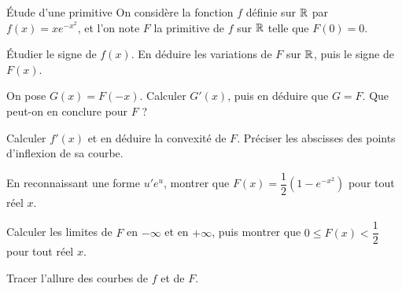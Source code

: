 \begin{exercice}[3]{Étude d'une primitive}
On considère la fonction $f$ définie sur $\mathbb{R}$ par $f(x)=xe^{-x^{2}}$, et l'on note $F$ la primitive de $f$ sur $\mathbb{R}$ telle que $F(0)=0$.
\begin{questions}
  \item Étudier le signe de $f(x)$. En déduire les variations de $F$ sur $\mathbb{R}$, puis le signe de $F(x)$.
  \item On pose $G(x)=F(-x)$. Calculer $G'(x)$, puis en déduire que $G=F$. Que peut-on en conclure pour $F$ ?
  \item Calculer $f'(x)$ et en déduire la convexité de $F$. Préciser les abscisses des points d'inflexion de sa courbe.
\end{questions}
\begin{questions}[resume]
  \item En reconnaissant une forme $u'e^{u}$, montrer que $F(x)=\dfrac12\left(1-e^{-x^{2}}\right)$ pour tout réel $x$.
  \item Calculer les limites de $F$ en $-\infty$ et en $+\infty$, puis montrer que $0\leq F(x)<\dfrac12$ pour tout réel $x$.
  \item Tracer l'allure des courbes de $f$ et de $F$.
\end{questions}
\end{exercice}
